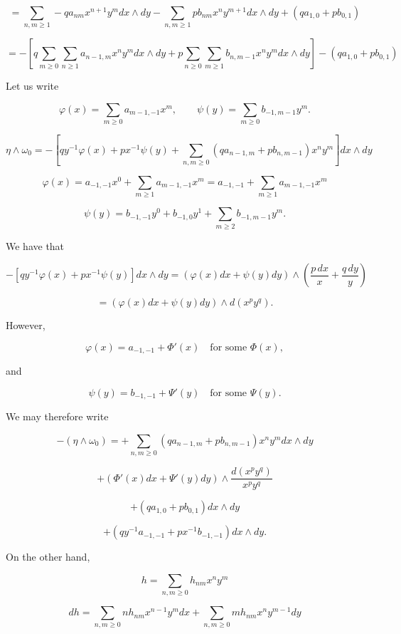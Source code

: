 \documentclass[11pt,a4paper]{amsart}
\theoremstyle{definition}
\begin{document}
\[
=
\sum_{n,m\ge1}
-q a_{nm} x^{n+1} y^m dx\wedge dy
-
\sum_{n,m\ge1}
p b_{nm} x^n y^{m+1} dx\wedge dy
+ (q a_{1,0}+p b_{0,1})
\]

\[
=
-
\left[
q \sum_{m\ge0}\sum_{n\ge1}
a_{n-1,m} x^n y^m dx\wedge dy
+
p \sum_{n\ge0}\sum_{m\ge1}
b_{n,m-1} x^n y^m dx\wedge dy
\right]
-
(q a_{1,0}+p b_{0,1})
\]

\bigskip

Let us write

\[
\varphi(x)
=
\sum_{m\ge0} a_{m-1,-1} x^m,
\qquad
\psi(y)
=
\sum_{m\ge0} b_{-1,m-1} y^m .
\]

\[
\eta\wedge \omega_0
=
-
\left[
q y^{-1}\varphi(x)
+
p x^{-1}\psi(y)
+
\sum_{n,m\ge0}
(q a_{n-1,m} + p b_{n,m-1}) x^n y^m
\right]
dx\wedge dy
\]

\bigskip

\[
\varphi(x)
=
a_{-1,-1}x^0
+
\sum_{m\ge1} a_{m-1,-1}x^m
=
a_{-1,-1} + \sum_{m\ge1} a_{m-1,-1}x^m
\]

\[
\psi(y)
=
b_{-1,-1}y^0
+
b_{-1,0}y^1
+
\sum_{m\ge2} b_{-1,m-1}y^m .
\]

We have that

\[
-
\left[
q y^{-1}\varphi(x)
+
p x^{-1}\psi(y)
\right] dx\wedge dy
=
(\varphi(x)dx + \psi(y)dy)
\wedge
\left(
\frac{p\,dx}{x} + \frac{q\,dy}{y}
\right)
\]

\[
=
(\varphi(x)dx + \psi(y)dy)
\wedge
d(x^p y^q).
\]

However,

\[
\varphi(x) = a_{-1,-1} + \Phi'(x)
\quad \text{for some } \Phi(x),
\]

and

\[
\psi(y) = b_{-1,-1} + \Psi'(y)
\quad \text{for some } \Psi(y).
\]

\bigskip

We may therefore write

\[
-
(\eta\wedge \omega_0)
=
+
\sum_{n,m\ge0}
(q a_{n-1,m} + p b_{n,m-1}) x^n y^m dx\wedge dy
\]

\[
+
(\Phi'(x)dx + \Psi'(y)dy)
\wedge
\frac{d(x^p y^q)}{x^p y^q}
\]

\[
+
(q a_{1,0}+p b_{0,1}) dx\wedge dy
\]

\[
+
\left(
q y^{-1} a_{-1,-1}
+
p x^{-1} b_{-1,-1}
\right) dx\wedge dy .
\]

On the other hand,

\[
h = \sum_{n,m\ge0} h_{nm} x^n y^m
\]

\[
dh =
\sum_{n,m\ge0} n h_{nm} x^{n-1} y^m dx
+
\sum_{n,m\ge0} m h_{nm} x^n y^{m-1} dy
\]
\end{document}
